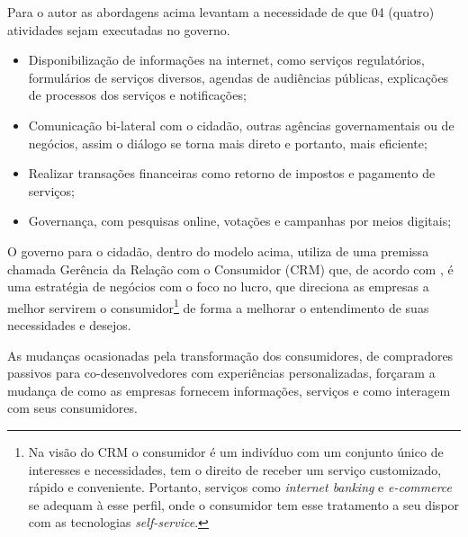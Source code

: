 Para o autor as abordagens acima levantam a necessidade de que 04 (quatro) atividades sejam executadas no governo. 
\begin{itemize}
	\item Disponibilização de informações na internet, como serviços regulatórios, formulários de serviços diversos, agendas de audiências públicas, explicações de processos dos serviços e notificações;
	\item Comunicação bi-lateral com o cidadão, outras agências governamentais ou de negócios, assim o diálogo se torna mais direto e portanto, mais eficiente;
	\item Realizar transações financeiras como retorno de impostos e pagamento de serviços;
	\item Governança, com pesquisas online, votações e campanhas por meios digitais;
\end{itemize}

O governo para o cidadão, dentro do modelo acima, utiliza de uma premissa chamada Gerência da Relação com o Consumidor (CRM) que, de acordo com \cite{larsen2005}, é uma estratégia de negócios com o foco no lucro, que direciona as empresas a melhor servirem o consumidor\footnote{Na visão do CRM o consumidor é um indivíduo com um conjunto único de interesses e necessidades, tem o direito de receber um serviço customizado, rápido e conveniente. Portanto, serviços como \textit{internet banking} e \textit{e-commerce} se adequam à esse perfil, onde o consumidor tem esse tratamento a seu dispor com as tecnologias \textit{self-service}.} de forma a melhorar o entendimento de suas necessidades e desejos.

As mudanças ocasionadas pela transformação dos consumidores, de compradores passivos para co-desenvolvedores com experiências personalizadas, forçaram a mudança de como as empresas fornecem informações, serviços e como interagem com seus consumidores. 

